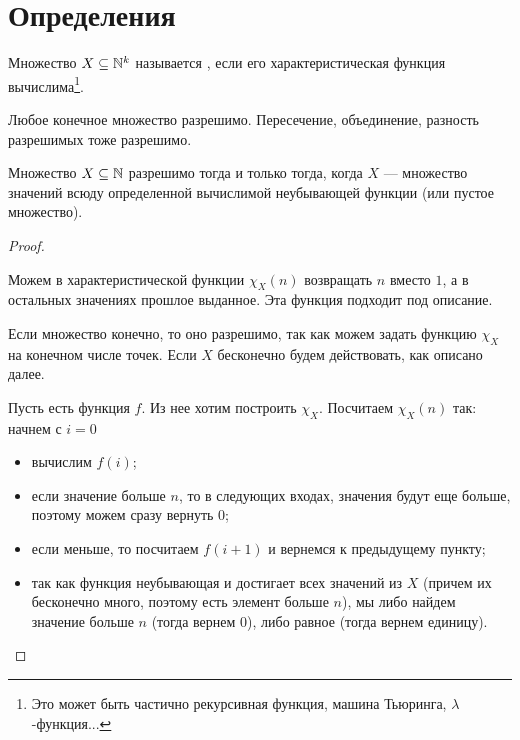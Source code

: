 \section{Определения}
\begin{defn}
	Множество $ X \subseteq \mathbb{N}^{k}$ называется , если его характеристическая функция вычислима\footnote{Это может быть частично рекурсивная функция, машина Тьюринга, $ \lambda$-функция...}.
\end{defn}
\begin{note}
    Любое конечное множество разрешимо. Пересечение, объединение, разность разрешимых тоже разрешимо.
\end{note}
\begin{thm}
	Множество $ X \subseteq \mathbb{N}$ разрешимо тогда и только тогда, когда $ X$ --- множество значений всюду определенной вычислимой неубывающей функции (или пустое множество).
\end{thm}
\begin{proof}
	~\begin{description}
		\item {} Можем в характеристической функции $ \chi_{X}(n)$ возвращать $ n$ вместо $ 1$, а в остальных значениях прошлое выданное. Эта функция подходит под описание.
        \item {} 
			Если множество конечно, то оно разрешимо, так как можем задать функцию $ \chi_X$ на конечном числе точек. 
			Если $ X$ бесконечно будем действовать, как описано далее.

			Пусть есть функция $ f$. Из нее хотим построить $ \chi_{X}$. Посчитаем $ \chi_{X}(n)$ так: 
			начнем с $ i = 0$
			\begin{itemize}
				\item вычислим $ f(i)$;
				\item если значение больше $ n$, то в следующих входах, значения будут еще больше, поэтому можем сразу вернуть  0;
				\item если меньше, то посчитаем $ f(i+1)$ и вернемся к предыдущему пункту;
				\item так как функция неубывающая и достигает всех значений из $ X$ (причем их бесконечно много, поэтому есть элемент больше $ n$), мы либо найдем значение больше $ n$ (тогда вернем $ 0$), либо равное (тогда вернем единицу).
			\end{itemize}
    \end{description} 
\end{proof}

